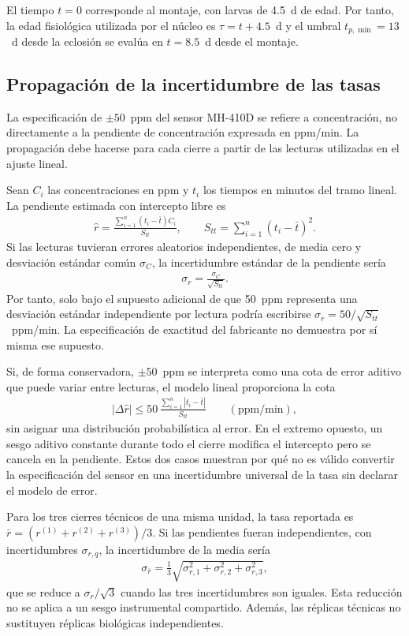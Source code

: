 El tiempo $t=0$ corresponde al montaje, con larvas de 4.5~d de edad. Por
tanto, la edad fisiológica utilizada por el núcleo es $\tau=t+4.5$~d y el
umbral $t_{p,\min}=13$~d desde la eclosión se evalúa en $t=8.5$~d desde el
montaje.

\subsection{Propagación de la incertidumbre de las tasas}
\label{sup:incertidumbre}
La especificación de $\pm 50$~ppm del sensor MH-410D se refiere a concentración,
no directamente a la pendiente de concentración expresada en ppm/min. La
propagación debe hacerse para cada cierre a partir de las lecturas utilizadas
en el ajuste lineal.

Sean $C_i$ las concentraciones en ppm y $t_i$ los tiempos en minutos del tramo
lineal. La pendiente estimada con intercepto libre es
\begin{align*}
\widehat r
  =\frac{\sum_{i=1}^{n}(t_i-\bar t)C_i}{S_{tt}},
\qquad
S_{tt}=\sum_{i=1}^{n}(t_i-\bar t)^2 .
\end{align*}
Si las lecturas tuvieran errores aleatorios independientes, de media cero y
desviación estándar común $\sigma_C$, la incertidumbre estándar de la
pendiente sería
\begin{align*}
\sigma_r=\frac{\sigma_C}{\sqrt{S_{tt}}}.
\end{align*}
Por tanto, solo bajo el supuesto adicional de que 50~ppm representa una
desviación estándar independiente por lectura podría escribirse
$\sigma_r=50/\sqrt{S_{tt}}$~ppm/min. La especificación de exactitud del
fabricante no demuestra por sí misma ese supuesto.

Si, de forma conservadora, $\pm 50$~ppm se interpreta como una cota de error
aditivo que puede variar entre lecturas, el modelo lineal proporciona la cota
\begin{align*}
|\Delta\widehat r|
  \leq 50\,\frac{\sum_{i=1}^{n}|t_i-\bar t|}{S_{tt}}
  \qquad (\mathrm{ppm/min}),
\end{align*}
sin asignar una distribución probabilística al error. En el extremo opuesto,
un sesgo aditivo constante durante todo el cierre modifica el intercepto pero
se cancela en la pendiente. Estos dos casos muestran por qué no es válido
convertir la especificación del sensor en una incertidumbre universal de la
tasa sin declarar el modelo de error.

Para los tres cierres técnicos de una misma unidad, la tasa reportada es
$\bar r=(r^{(1)}+r^{(2)}+r^{(3)})/3$. Si las pendientes fueran independientes,
con incertidumbres $\sigma_{r,q}$, la incertidumbre de la media sería
\begin{align*}
\sigma_{\bar r}
  =\frac{1}{3}\sqrt{\sigma_{r,1}^2+\sigma_{r,2}^2+\sigma_{r,3}^2},
\end{align*}
que se reduce a $\sigma_r/\sqrt{3}$ cuando las tres incertidumbres son
iguales. Esta reducción no se aplica a un sesgo instrumental compartido.
Además, las réplicas técnicas no sustituyen réplicas biológicas independientes.

